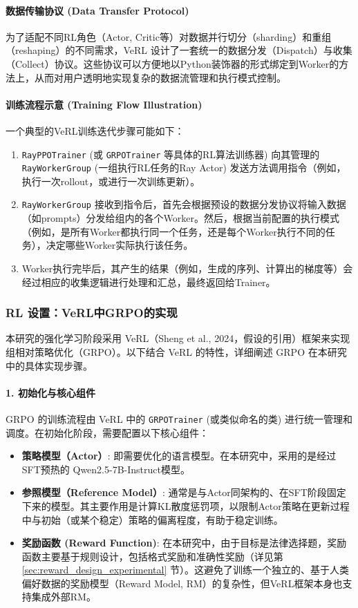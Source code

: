 \documentclass{pkuthesis}
\newcommand{\qwen}{Qwen2.5-7B-Instruct}
\begin{document}
\paragraph{数据传输协议 (Data Transfer Protocol)}
为了适配不同RL角色（Actor, Critic等）对数据并行切分（sharding）和重组（reshaping）的不同需求，VeRL 设计了一套统一的数据分发（Dispatch）与收集（Collect）协议。这些协议可以方便地以Python装饰器的形式绑定到Worker的方法上，从而对用户透明地实现复杂的数据流管理和执行模式控制。

\paragraph{训练流程示意 (Training Flow Illustration)}
一个典型的VeRL训练迭代步骤可能如下：
\begin{enumerate}
    \item \texttt{RayPPOTrainer} (或 \texttt{GRPOTrainer} 等具体的RL算法训练器) 向其管理的 \texttt{RayWorkerGroup} (一组执行RL任务的Ray Actor) 发送方法调用指令（例如，执行一次rollout，或进行一次训练更新）。
    \item \texttt{RayWorkerGroup} 接收到指令后，首先会根据预设的数据分发协议将输入数据（如prompts）分发给组内的各个Worker。然后，根据当前配置的执行模式（例如，是所有Worker都执行同一个任务，还是每个Worker执行不同的任务），决定哪些Worker实际执行该任务。
    \item Worker执行完毕后，其产生的结果（例如，生成的序列、计算出的梯度等）会经过相应的收集逻辑进行处理和汇总，最终返回给Trainer。
\end{enumerate}

\subsubsection{RL 设置：VeRL中GRPO的实现}
本研究的强化学习阶段采用 VeRL（Sheng et al., 2024，假设的引用）框架来实现组相对策略优化（GRPO）。以下结合 VeRL 的特性，详细阐述 GRPO 在本研究中的具体实现步骤。

\paragraph{1. 初始化与核心组件}
GRPO 的训练流程由 VeRL 中的 \texttt{GRPOTrainer} (或类似命名的类) 进行统一管理和调度。在初始化阶段，需要配置以下核心组件：
\begin{itemize}
    \item \textbf{策略模型（Actor）}: 即需要优化的语言模型。在本研究中，采用的是经过SFT预热的 \qwen 模型。
    \item \textbf{参照模型（Reference Model）}: 通常是与Actor同架构的、在SFT阶段固定下来的模型。其主要作用是计算KL散度惩罚项，以限制Actor策略在更新过程中与初始（或某个稳定）策略的偏离程度，有助于稳定训练。
    \item \textbf{奖励函数 (Reward Function)}: 在本研究中，由于目标是法律选择题，奖励函数主要基于规则设计，包括格式奖励和准确性奖励（详见第 \ref{sec:reward_design_experimental} 节）。这避免了训练一个独立的、基于人类偏好数据的奖励模型（Reward Model, RM）的复杂性，但VeRL框架本身也支持集成外部RM。
\end{itemize}
\end{document}
